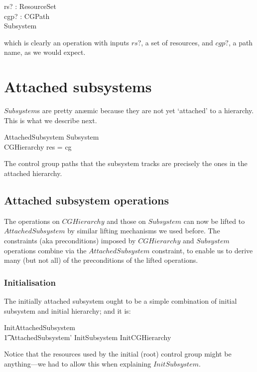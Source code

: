 \documentclass[a4paper,twoside,12pt]{article}
\begin{document}
\begin{schema*}
rs? : ResourceSet\\
cgp? : CGPath\\
\Delta Subsystem
\end{schema*}
which is clearly an operation with inputs $rs?$, a set of resources, and $cgp?$, a path name, as we would expect.

\section{Attached subsystems}
$Subsystem$s are pretty an\ae{}mic because they are not yet `attached' to a hierarchy. This is what we describe next.

\begin{schema}{AttachedSubsystem}
Subsystem \\
CGHierarchy
\where
\dom res = \dom cg
\end{schema}
The control group paths that the subsystem tracks are precisely the ones in
the attached hierarchy.

\subsection{Attached subsystem operations}
The operations on $CGHierarchy$ and those on $Subsystem$ can now be lifted to $AttachedSubsystem$
by similar lifting mechanisms we used before. The constraints (aka preconditions) imposed
by $CGHierarchy$ and $Subsystem$ operations combine via the
$AttachedSubsystem$ constraint, to enable us to derive many (but not all) of the preconditions of the lifted operations.

\subsubsection{Initialisation}

The initially attached subsystem ought to be a simple combination of initial subsystem and initial hierarchy; and it is:

\begin{zed}
InitAttachedSubsystem  \\
\t1 AttachedSubsystem' \land InitSubsystem \land InitCGHierarchy
\end{zed}
Notice that the resources used by the initial (root) control group might be anything---we had to allow this when
explaining $InitSubsystem$.
\end{document}
